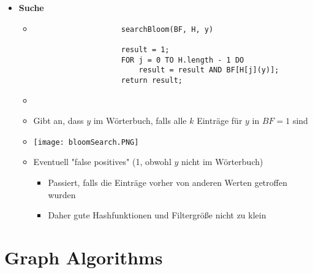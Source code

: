 \begin{itemize}
\pagebreak

        \item \textbf{Suche}
            \begin{itemize}
                \item[]
                    \begin{verbatim}
                    searchBloom(BF, H, y)

                    result = 1;
                    FOR j = 0 TO H.length - 1 DO
                        result = result AND BF[H[j](y)];
                    return result;
                    \end{verbatim}
                \item[]
                \item Gibt an, dass $y$ im Wörterbuch, falls alle $k$ Einträge für $y$ in $BF=1$ sind
                \item[] \texttt{[image: bloomSearch.PNG]}
                \item Eventuell \string"false positives\string" (1, obwohl $y$ nicht im Wörterbuch)
                    \begin{itemize}
                        \item Passiert, falls die Einträge vorher von anderen Werten getroffen wurden
                        \item Daher gute Hashfunktionen und Filtergrö\ss e nicht zu klein
                    \end{itemize}
            \end{itemize}
    \end{itemize}

\section{Graph Algorithms}
